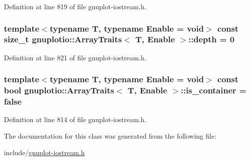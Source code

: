 Definition at line 819 of file gnuplot-\/iostream.\+h.

\subsubsection[{\texorpdfstring{depth}{depth}}]{\setlength{\rightskip}{0pt plus 5cm}template$<$typename T, typename Enable = void$>$ const size\+\_\+t {\bf gnuplotio\+::\+Array\+Traits}$<$ T, Enable $>$\+::depth = 0\hspace{0.3cm}{\ttfamily [static]}}\hypertarget{classgnuplotio_1_1_array_traits_a6fbd8c815e595f4efbcafd9b0eeb06f2}{}\label{classgnuplotio_1_1_array_traits_a6fbd8c815e595f4efbcafd9b0eeb06f2}


Definition at line 821 of file gnuplot-\/iostream.\+h.

\subsubsection[{\texorpdfstring{is\+\_\+container}{is_container}}]{\setlength{\rightskip}{0pt plus 5cm}template$<$typename T, typename Enable = void$>$ const bool {\bf gnuplotio\+::\+Array\+Traits}$<$ T, Enable $>$\+::is\+\_\+container = false\hspace{0.3cm}{\ttfamily [static]}}\hypertarget{classgnuplotio_1_1_array_traits_ac5d19b25086565613c305960bd9d4a78}{}\label{classgnuplotio_1_1_array_traits_ac5d19b25086565613c305960bd9d4a78}


Definition at line 814 of file gnuplot-\/iostream.\+h.



The documentation for this class was generated from the following file\+:\begin{DoxyCompactItemize}
\item 
include/\hyperlink{gnuplot-iostream_8h}{gnuplot-\/iostream.\+h}\end{DoxyCompactItemize}
